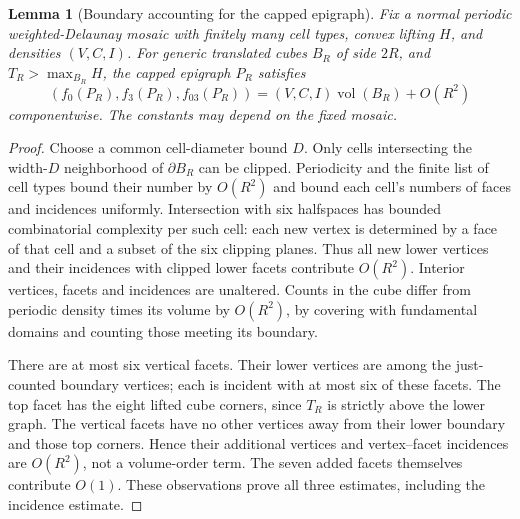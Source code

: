 \documentclass[11pt,a4paper]{article}
\newtheorem{lemma}[theorem]{Lemma}
\theoremstyle{definition}\newtheorem{definition}[theorem]{Definition}
\theoremstyle{remark}\newtheorem{remark}[theorem]{Remark}
\begin{document}
\begin{lemma}[Boundary accounting for the capped epigraph]\label{lem:cap}
Fix a normal periodic weighted-Delaunay mosaic with finitely many cell types, convex lifting $H$, and densities $(V,C,I)$. For generic translated cubes $B_R$ of side $2R$, and $T_R>\max_{B_R}H$, the capped epigraph $P_R$ satisfies
\[
(f_0(P_R),f_3(P_R),f_{03}(P_R))=(V,C,I)\operatorname{vol}(B_R)+O(R^2)
\]
componentwise. The constants may depend on the fixed mosaic.
\end{lemma}
\begin{proof}
Choose a common cell-diameter bound $D$. Only cells intersecting the width-$D$ neighborhood of $\partial B_R$ can be clipped. Periodicity and the finite list of cell types bound their number by $O(R^2)$ and bound each cell's numbers of faces and incidences uniformly. Intersection with six halfspaces has bounded combinatorial complexity per such cell: each new vertex is determined by a face of that cell and a subset of the six clipping planes. Thus all new lower vertices and their incidences with clipped lower facets contribute $O(R^2)$. Interior vertices, facets and incidences are unaltered. Counts in the cube differ from periodic density times its volume by $O(R^2)$, by covering with fundamental domains and counting those meeting its boundary.

There are at most six vertical facets. Their lower vertices are among the just-counted boundary vertices; each is incident with at most six of these facets. The top facet has the eight lifted cube corners, since $T_R$ is strictly above the lower graph. The vertical facets have no other vertices away from their lower boundary and those top corners. Hence their additional vertices and vertex--facet incidences are $O(R^2)$, not a volume-order term. The seven added facets themselves contribute $O(1)$. These observations prove all three estimates, including the incidence estimate.
\end{proof}
\end{document}
